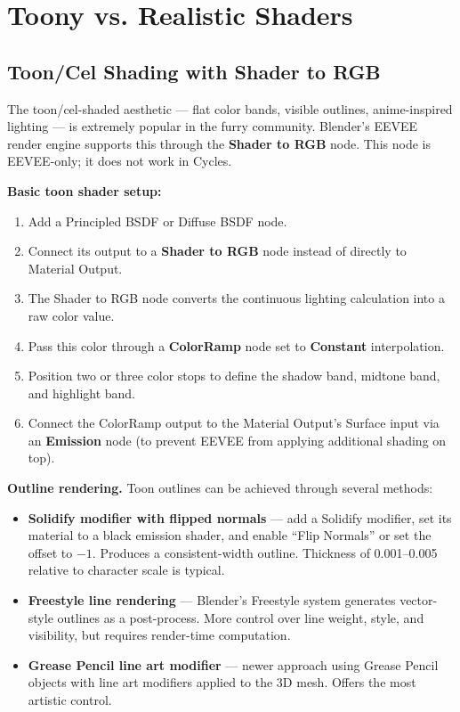 
\section{Toony vs. Realistic Shaders}
\label{sec:furry-shaders}

\subsection{Toon/Cel Shading with Shader to RGB}

The toon/cel-shaded aesthetic --- flat color bands, visible outlines, anime-inspired lighting --- is extremely popular in the furry community. Blender's EEVEE render engine supports this through the \textbf{Shader to RGB} node. This node is EEVEE-only; it does not work in Cycles.

\textbf{Basic toon shader setup:}

\begin{enumerate}[leftmargin=2em]
  \item Add a Principled BSDF or Diffuse BSDF node.
  \item Connect its output to a \textbf{Shader to RGB} node instead of directly to Material Output.
  \item The Shader to RGB node converts the continuous lighting calculation into a raw color value.
  \item Pass this color through a \textbf{ColorRamp} node set to \textbf{Constant} interpolation.
  \item Position two or three color stops to define the shadow band, midtone band, and highlight band.
  \item Connect the ColorRamp output to the Material Output's Surface input via an \textbf{Emission} node (to prevent EEVEE from applying additional shading on top).
\end{enumerate}

\textbf{Outline rendering.} Toon outlines can be achieved through several methods:

\begin{itemize}[leftmargin=2em]
  \item \textbf{Solidify modifier with flipped normals} --- add a Solidify modifier, set its material to a black emission shader, and enable ``Flip Normals'' or set the offset to $-1$. Produces a consistent-width outline. Thickness of 0.001--0.005 relative to character scale is typical.
  \item \textbf{Freestyle line rendering} --- Blender's Freestyle system generates vector-style outlines as a post-process. More control over line weight, style, and visibility, but requires render-time computation.
  \item \textbf{Grease Pencil line art modifier} --- newer approach using Grease Pencil objects with line art modifiers applied to the 3D mesh. Offers the most artistic control.
\end{itemize}

